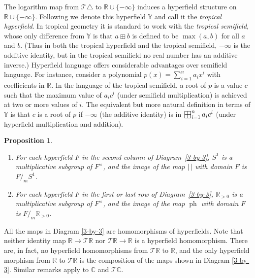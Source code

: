 \documentclass[10pt, preprint]{article}
\newtheorem{prop}[theorem]{Proposition}
\theoremstyle{definition}
\newcommand{\bighplus}{
  \mathop{
    \vphantom{\bigoplus} 
    \mathchoice
      {\vcenter{\hbox{\resizebox{\widthof{$\displaystyle\bigoplus$}}{!}{$\boxplus$}}}}
      {\vcenter{\hbox{\resizebox{\widthof{$\bigoplus$}}{!}{$\boxplus$}}}}
      {\vcenter{\hbox{\resizebox{\widthof{$\scriptstyle\oplus$}}{!}{$\boxplus$}}}}
      {\vcenter{\hbox{\resizebox{\widthof{$\scriptscriptstyle\oplus$}}{!}{$\boxplus$}}}}
  }\displaylimits 
}
\begin{document}
\begin{enumerate}
The logarithm map from $\mathcal{T }\triangle $ to $\mathbb{R}\cup \{-
\infty \}$ induces a hyperfield structure on $\mathbb{R}\cup \{-
\infty \}$. Following \cite{Viro} we denote this hyperfield
$\mathbb{Y}$ and call it the \emph{tropical hyperfield}. In tropical
geometry it is standard to work with the \emph{tropical semifield}, whose
only difference from $\mathbb{Y}$ is that $a\boxplus b$ is defined to
be $\max (a,b)$ for all $a$ and $b$. (Thus in both the tropical
hyperfield and the tropical semifield, $-\infty $ is the additive
identity, but in the tropical semifield no real number has an additive
inverse.) Hyperfield language offers considerable advantages over
semifield language. For instance, consider a polynomial $p(x)=\sum
_{i=1}^{n} a_{i} x^{i}$ with coefficients in $\mathbb{R}$. In the
language of the tropical semifield, a root of $p$ is a value $c$ such
that the maximum value of $a_{i} c^{i}$ (under semifield multiplication)
is achieved at two or more values of $i$. The equivalent but more
natural definition in terms of $\mathbb{Y}$ is that $c$ is a root of
$p$ if $-\infty $ (the additive identity) is in $\bighplus _{i=1}^{n}
a_{i} c^{i}$ (under hyperfield multiplication and addition).
\end{enumerate}

\begin{prop}
%
\begin{enumerate}[\textit{2.}]%
\item[\textit{1.}]
For each hyperfield $F$ in the second column of Diagram~\eqref{3-by-3},
$S^{1}$ is a multiplicative subgroup of $F^{\times }$, and the image of
the map $|~|$ with domain $F$ is $F/_{m} S^{1}$.
%
\item[\textit{2.}]
For each hyperfield $F$ in the first or last row of
Diagram~\eqref{3-by-3}, $\mathbb{R}_{>0}$ is a multiplicative subgroup
of $F^{\times }$, and the image of the map $\operatorname{ph}$ with
domain $F$ is $F/_{m} \mathbb{R}_{>0}$.
\end{enumerate}
%
\end{prop}

All the maps in Diagram \eqref{3-by-3} are homomorphisms of hyperfields.
Note that neither identity map $\mathbb{R}\to \mathcal{T }\mathbb{R}$
nor $\mathcal{T }\mathbb{R}\to \mathbb{R}$ is a hyperfield homomorphism.
There are, in fact, no hyperfield homomorphisms from $\mathcal{T }
\mathbb{R}$ to $\mathbb{R}$, and the only hyperfield morphism from
$\mathbb{R}$ to $\mathcal{T }\mathbb{R}$ is the composition of the maps
shown in Diagram \eqref{3-by-3}. Similar remarks apply to $\mathbb{C}$
and $\mathcal{T }\mathbb{C}$.
\end{document}
